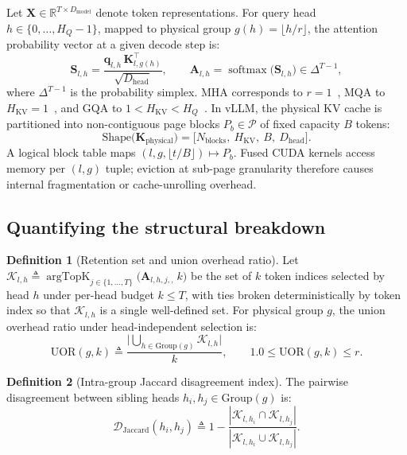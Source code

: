 \documentclass[final,5p,times,twocolumn]{elsarticle}
\DeclareMathOperator{\argTopK}{argTopK}
\DeclareMathOperator{\softmax}{softmax}
\theoremstyle{definition}
\newtheorem{definition}{Definition}
\theoremstyle{remark}
\newcommand{\HQ}{H_{Q}}
\newcommand{\HKV}{H_{\mathrm{KV}}}
\newcommand{\Dmodel}{D_{\mathrm{model}}}
\newcommand{\Dhead}{D_{\mathrm{head}}}
\newcommand{\Nblk}{N_{\mathrm{blocks}}}
\newcommand{\Attn}[2]{\mathbf{A}_{#1,#2}}
\newcommand{\UOR}{\mathrm{UOR}}
\newcommand{\Group}[1]{\mathrm{Group}(#1)}
\newcommand{\PageSet}{\mathcal{P}}
\newcommand{\TokSet}[1]{\mathcal{K}_{l,#1}}
\begin{document}
Let $\mathbf{X} \in \mathbb{R}^{T \times \Dmodel}$ denote token
representations. For query head $h \in \{0, \dots, \HQ-1\}$, mapped to
physical group $g(h) = \lfloor h/r \rfloor$, the attention probability
vector at a given decode step is:
\begin{equation}
\mathbf{S}_{l,h}
= \frac{\mathbf{q}_{l,h}\,\mathbf{K}_{l,g(h)}^{\top}}{\sqrt{\Dhead}},
\qquad
\Attn{l}{h} = \softmax\!\bigl(\mathbf{S}_{l,h}\bigr)
\in \Delta^{T-1},
\label{eq:gqa_attention}
\end{equation}
where $\Delta^{T-1}$ is the probability simplex. MHA corresponds to
 $r=1$~\cite{vaswani2017attention}, MQA to $\HKV=1$~\cite{shazeer2019fast},
and GQA to $1<\HKV<\HQ$~\cite{ainslie2023gqa}. In vLLM, the physical KV
cache is partitioned into non-contiguous page blocks $P_b \in \PageSet$ of fixed capacity $B$ tokens:
\begin{equation}
\mathrm{Shape}\bigl(\mathbf{K}_{\mathrm{physical}}\bigr)
= \bigl[\Nblk,\ \HKV,\ B,\ \Dhead\bigr].
\label{eq:paged_layout}
\end{equation}
A logical block table maps $(l,g,\lfloor t/B\rfloor)\mapsto P_b$. Fused
CUDA kernels access memory per $(l,g)$ tuple; eviction at sub-page
granularity therefore causes internal fragmentation or cache-unrolling
overhead.

\subsection{Quantifying the structural breakdown}
\label{subsec:uor}

\begin{definition}[Retention set and union overhead ratio]
\label{def:uor}
Let
 $\TokSet{h} \triangleq \argTopK_{j \in \{1,\dots,T\}}
 \bigl(\Attn{l,h,j},\, k\bigr)$ be the set of $k$ token indices selected by head $h$ under per-head
budget $k \le T$, with ties broken deterministically by token index so
that $\TokSet{h}$ is a single well-defined set. For physical group $g$,
the union overhead ratio under head-independent selection is:
\begin{equation}
\UOR(g, k)
\triangleq
\frac{\bigl|\bigcup_{h \in \Group{g}} \TokSet{h}\bigr|}{k},
\qquad
1.0 \le \UOR(g, k) \le r.
\label{eq:uor_def}
\end{equation}
\end{definition}

\begin{definition}[Intra-group Jaccard disagreement index]
\label{def:jaccard}
The pairwise disagreement between sibling heads
 $h_i, h_j \in \Group{g}$ is:
\begin{equation}
\mathcal{D}_{\mathrm{Jaccard}}(h_i, h_j)
\triangleq 1 -
\frac{|\TokSet{h_i} \cap \TokSet{h_j}|}
     {|\TokSet{h_i} \cup \TokSet{h_j}|}.
\label{eq:jaccard_def}
\end{equation}
\end{definition}
\end{document}
